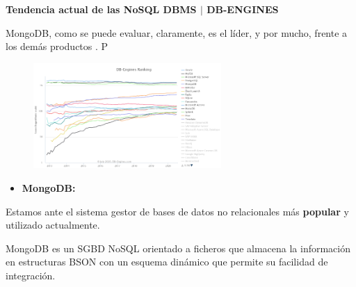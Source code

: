 \documentclass[12pt]{article}
\begin{document}
\begin{multicols}{2}
\vspace{\baselineskip}

\vspace{\baselineskip}
{\fontsize{9pt}{10.8pt}\selectfont \textbf{Tendencia actual de las NoSQL DBMS $ \vert $  DB-ENGINES}\par}\par

{\fontsize{9pt}{10.8pt}\selectfont MongoDB, como se puede evaluar, claramente, es el líder, y por mucho, frente a los demás productos . P\par}\par




\begin{figure}[H]
	\begin{Center}
		\includegraphics[width=2.81in,height=1.58in]{./media/image10.png}
	\end{Center}
\end{figure}



\par


\vspace{\baselineskip}
\begin{itemize}
	\item {\fontsize{9pt}{10.8pt}\selectfont \textbf{MongoDB: }\par}
\end{itemize}\par

{\fontsize{9pt}{10.8pt}\selectfont Estamos ante el sistema gestor de bases de datos no relacionales más \textbf{popular }y utilizado actualmente.\par}\par

{\fontsize{9pt}{10.8pt}\selectfont MongoDB es un SGBD NoSQL orientado a ficheros que almacena la información en estructuras BSON con un esquema dinámico que permite su facilidad de integración.\par}\par


\end{multicols}
\end{document}
